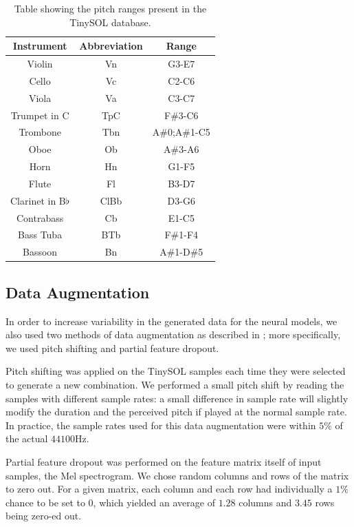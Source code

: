 \documentclass[runningheads,a4paper]{llncs}
\begin{document}
\begin{table}
\begin{center}
	\caption{Table showing the pitch ranges present in the TinySOL database.\label{tab:ranges}}
	\begin{tabular}{|c|c|c|}
	\hline
	\textbf{Instrument} & \textbf{Abbreviation} & \textbf{Range} \\
	\hline
	Violin & Vn & G3-E7\\
	Cello & Vc & C2-C6\\
	Viola & Va & C3-C7\\
	Trumpet in C & TpC & F\#3-C6\\
	Trombone & Tbn & A\#0;A\#1-C5\\
	Oboe & Ob & A\#3-A6\\
	Horn & Hn & G1-F5\\
	Flute & Fl & B3-D7\\
	Clarinet in B$\flat$ & ClBb & D3-G6\\
	Contrabass & Cb & E1-C5\\
	Bass Tuba & BTb & F\#1-F4\\
	Bassoon & Bn & A\#1-D\#5\\
	\hline
	\end{tabular}
\end{center}
\end{table}

\subsection{Data Augmentation}

In order to increase variability in the generated data for the neural models, we also used two methods of data augmentation as described in \cite{Salamon17, Bhardwaj17}; more specifically, we used pitch shifting and partial feature dropout.

Pitch shifting was applied on the TinySOL samples each time they were selected to generate a new combination. We performed a small pitch shift by reading the samples with different sample rates: a small difference in sample rate will slightly modify the duration and the perceived pitch if played at the normal sample rate. In practice, the sample rates used for this data augmentation were within $5\%$ of the actual $44100$Hz.

Partial feature dropout was performed on the feature matrix itself of input samples, the Mel spectrogram. We chose random columns and rows of the matrix to zero out. For a given matrix, each column and each row had individually a $1\%$ chance to be set to 0, which yielded an average of $1.28$  columns and $3.45$ rows being zero-ed out.
\end{document}
